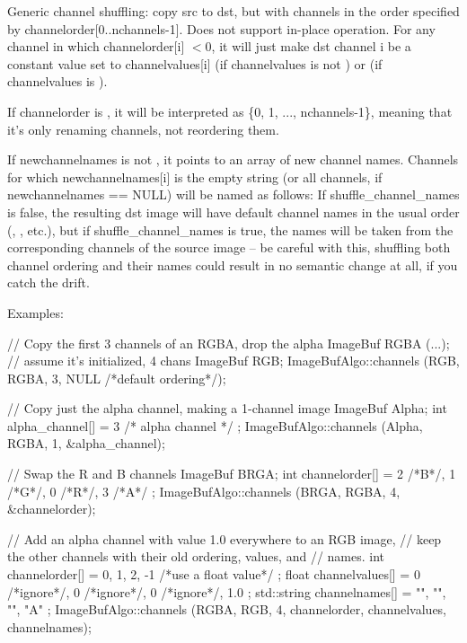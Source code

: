   \label{sec:iba:channels}

Generic channel shuffling: copy {\cf src} to {\cf dst}, but with channels in
the order specified by {\cf channelorder[0..nchannels-1]}.  Does not support in-place
operation.  For any channel in which {\cf channelorder[i]} $< 0$, it will
just make {\cf dst} channel {\cf i} be a constant value set to {\cf channelvalues[i]}
(if {\cf channelvalues} is not \NULL) or {} (if {\cf channelvalues} is \NULL).

If {\cf channelorder} is \NULL, it will be interpreted as
{\cf \{0, 1, ..., nchannels-1\}}, meaning that it's only renaming channels,
not reordering them.

If {\cf newchannelnames} is not \NULL, it points to an array of new channel
names.  Channels for which {\cf newchannelnames[i]} is the empty string (or
all channels, if {\cf newchannelnames == NULL}) will be named as follows:
If {\cf shuffle_channel_names} is {\cf false}, the resulting dst image will have
default channel names in the usual order (, , etc.), but if
{\cf shuffle_channel_names} is {\cf true}, the names will be taken from the
corresponding channels of the source image -- be careful with this,
shuffling both channel ordering and their names could result in no
semantic change at all, if you catch the drift.

\smallskip
\noindent Examples:
\begin{code}
    // Copy the first 3 channels of an RGBA, drop the alpha
    ImageBuf RGBA (...);   // assume it's initialized, 4 chans
    ImageBuf RGB;
    ImageBufAlgo::channels (RGB, RGBA, 3, NULL /*default ordering*/);

    // Copy just the alpha channel, making a 1-channel image
    ImageBuf Alpha;
    int alpha_channel[] = { 3 /* alpha channel */ };
    ImageBufAlgo::channels (Alpha, RGBA, 1, &alpha_channel);

    // Swap the R and B channels
    ImageBuf BRGA;
    int channelorder[] = { 2 /*B*/, 1 /*G*/, 0 /*R*/, 3 /*A*/ };
    ImageBufAlgo::channels (BRGA, RGBA, 4, &channelorder);

    // Add an alpha channel with value 1.0 everywhere to an RGB image,
    // keep the other channels with their old ordering, values, and
    // names.
    int channelorder[] = { 0, 1, 2, -1 /*use a float value*/ };
    float channelvalues[] = { 0 /*ignore*/, 0 /*ignore*/, 0 /*ignore*/, 1.0 };
    std::string channelnames[] = { "", "", "", "A" };
    ImageBufAlgo::channels (RGBA, RGB, 4, channelorder,
                            channelvalues, channelnames);
\end{code}
\apiend

